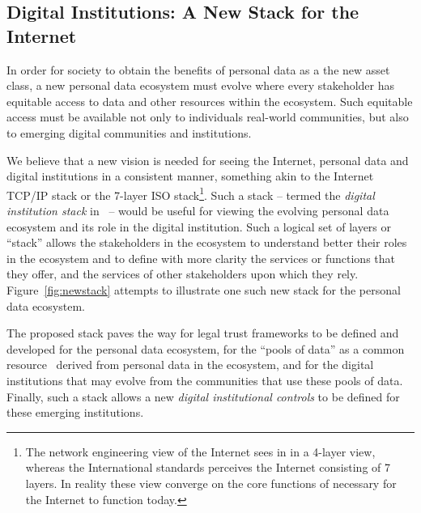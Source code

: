 \subsection{Digital Institutions: A New Stack for the Internet}

In order for society to obtain the benefits of 
personal data as a the new asset class,
a new personal data ecosystem must evolve where
every stakeholder has equitable access to data and other resources
within the ecosystem.
Such equitable access must be available not only to individuals
real-world communities,
but also to emerging digital communities and institutions.

We believe that a new vision is needed for seeing the 
Internet, personal data and digital institutions
in a consistent manner, something akin to the Internet
TCP/IP stack or the 7-layer ISO stack\footnote{
The network engineering view of the Internet sees
in in a 4-layer view, whereas the International standards
perceives the Internet consisting of 7 layers.
In reality these view converge on the core functions
of necessary for the Internet to function today.}.
Such a stack -- termed the {\em digital institution stack} in~\cite{HardjonoDeegan2014} --
would be useful for viewing the evolving personal data ecosystem
and its role in the digital institution.
Such a logical set of layers or ``stack'' allows the stakeholders in the ecosystem
to understand better their roles in the ecosystem
and to define with more clarity the services or functions
that they offer, and the services
of other stakeholders upon which they rely.
Figure~\ref{fig:newstack} attempts to illustrate
one such new stack for the personal data ecosystem.

The proposed stack paves the way for legal trust frameworks
to be defined and developed for the personal data ecosystem,
for the ``pools of data'' as a common resource~\cite{Ostrom2009}
derived from personal data in the ecosystem,
and for the digital institutions that may evolve
from the communities that use these pools of data.
Finally, such a stack allows a  new {\em digital institutional controls}
to be defined for these emerging institutions.

